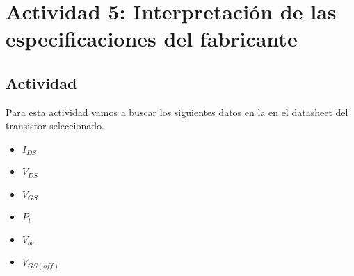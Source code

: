 \newpage

\section{Actividad 5: Interpretación de las especificaciones del fabricante}

\subsection{Actividad}

Para esta actividad vamos a buscar los siguientes datos en la en el datasheet del transistor seleccionado.

\begin{itemize}
    \item $I_{DS}$
    \item $V_{DS}$
    \item $V_{GS}$
    \item $P_{t}$
    \item $V_{br}$
    \item $V_{GS(off)}$
\end{itemize}